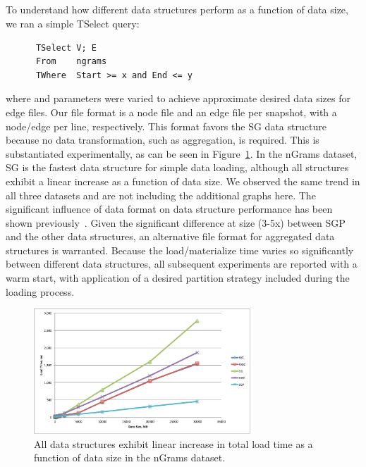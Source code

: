 \subsection{}

To understand how different data structures perform as a function of
data size, we ran a simple TSelect query:

\begin{small}
\begin{verbatim}
      TSelect V; E
      From    ngrams
      TWhere  Start >= x and End <= y
\end{verbatim}
\end{small}

where  and  parameters were varied to achieve
approximate desired data sizes for edge files.  Our file format is a
node file and an edge file per snapshot, with a node/edge per line,
respectively.  This format favors the SG data structure because no
data transformation, such as aggregation, is required.  This is
substantiated experimentally, as can be seen in
Figure~\ref{fig:tselect}.  In the nGrams dataset, SG is the fastest
data structure for simple data loading, although all structures
exhibit a linear increase as a function of data size.  We observed the
same trend in all three datasets and are not including the additional
graphs here. The significant influence of data format on data
structure performance has been shown
previously~\cite{DBLP:journals/tos/MiaoHLWYZPCC15}.  Given the
significant difference at size (3-5x) between SGP and the other data
structures, an alternative file format for aggregated data structures
is warranted.  Because the load/materialize time varies so
significantly between different data structures, all subsequent
experiments are reported with a warm start, with application of a
desired partition strategy included during the loading process.

\begin{figure}[t!]
\includegraphics[width=3.2in]{figs/tselect.pdf}
\caption{All data structures exhibit linear increase in total load
  time as a function of data size in the nGrams dataset.}
\label{fig:tselect}
\end{figure}

